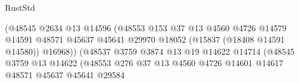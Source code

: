 \begin{lexlean}{RustStd}
\begin{coremodule}
{\begin{coremodule}
{{{{{{{{{{{{{{{{{{{{{{{{{{{{{{{{{{{{{{{{{{{{{{{{{{{{{{{{{{{{                                                    (@48545
                                                      @2634
                                                      @13
                                                      @14596
                                                      (@48553
                                                        @153
                                                        @37
                                                        @13
                                                        @4560
                                                        @4726
                                                        @14579
                                                        @14591
                                                        @48571
                                                        @45637
                                                        @45641
                                                        @29970
                                                        @18052
                                                        (@15837 (@18408 @14591 @14580))
                                                        @16968))
                                                    (@48537
                                                      @3759
                                                      @3874
                                                      @13
                                                      @19
                                                      @14622
                                                      @14714
                                                      (@48545
                                                        @3759
                                                        @13
                                                        @14622
                                                        (@48553
                                                          @276
                                                          @37
                                                          @13
                                                          @4560
                                                          @4726
                                                          @14601
                                                          @14617
                                                          @48571
                                                          @45637
                                                          @45641
                                                          @29584
}}}}}}}}}}}}}}}}}}}}}}}}}}}}}}}}}}}}}}}}}}}}}}}}}}}}}}}}}}}}
\end{coremodule}}
\end{coremodule}
\end{lexlean}
